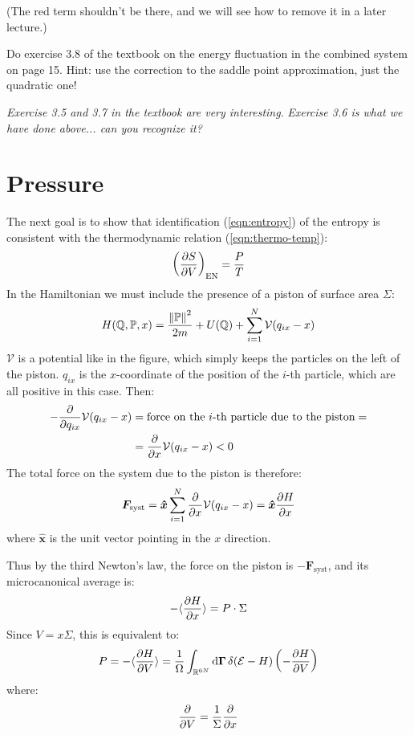 \documentclass[../template.tex]{subfiles}
\begin{document}
\medskip

(The red term shouldn't be there, and we will see how to remove it in a later lecture.)

\begin{exo}[6]
    Do exercise 3.8 of the textbook on the energy fluctuation in the combined system on page 15. Hint: use the correction to the saddle point approximation, just the quadratic one!
\end{exo}

\textit{Exercise 3.5 and 3.7 in the textbook are very interesting}. \textit{Exercise 3.6 is what we have done above... can you recognize it?}

\section{Pressure}
The next goal is to show that identification (\ref{eqn:entropy}) of the entropy is consistent with the thermodynamic relation (\ref{eqn:thermo-temp}):
\begin{align*}
    \left(\pdv{S}{V}\right)_{\mathrm{EN}} = \frac{P}{T} 
\end{align*}
In the Hamiltonian we must include the presence of a piston of surface area $\Sigma$:
\begin{align*}
    H(\mathbb{Q}, \mathbb{P}, x) = \frac{\norm{\mathbb{P}}^2}{2m} + U(\mathbb{Q}) + \sum_{i=1}^N \mathcal{V}(q_{ix} - x) 
\end{align*}%
$\mathcal{V}$ is a potential like in the figure, which simply keeps the particles on the left of the piston. $q_{ix}$ is the $x$-coordinate of the position of the $i$-th particle, which are all positive in this case. Then:
\begin{align*}
    -\pdv{q_{ix}} \mathcal{V}(q_{ix}-x) &= \text{force on the $i$-th particle due to the piston} = \\
    &=\pdv{x} \mathcal{V}(q_{ix} - x) < 0
\end{align*}
The total force on the system due to the piston is therefore:
\begin{align*}
    \bm{F}_{\mathrm{syst}} = \bm{\hat{x}} \sum_{i=1}^N \pdv{x} \mathcal{V}(q_{ix}-x) = \bm{\hat{x}} \pdv{H}{x}
\end{align*}
where $\bm{\hat{x}}$ is the unit vector pointing in the $x$ direction.

\medskip

Thus by the third Newton's law, the force on the piston is $-\bm{F}_{\mathrm{syst}}$, and its microcanonical average is:
\begin{align*}
    -\langle \pdv{H}{x} \rangle = P \cdot \Sigma
\end{align*}
Since $V = x \Sigma$, this is equivalent to:
\begin{align*}
    P = - \langle \pdv{H}{V} \rangle = \frac{1}{\Omega} \int_{\mathbb{R}^{6N}} \dd{\bm{\Gamma}} \delta(\mathcal{E}-H) \left(-\pdv{H}{V}\right)
\end{align*}
where:
\begin{align*}
    \pdv{V} = \frac{1}{\Sigma} \pdv{x} 
\end{align*}
\end{document}
